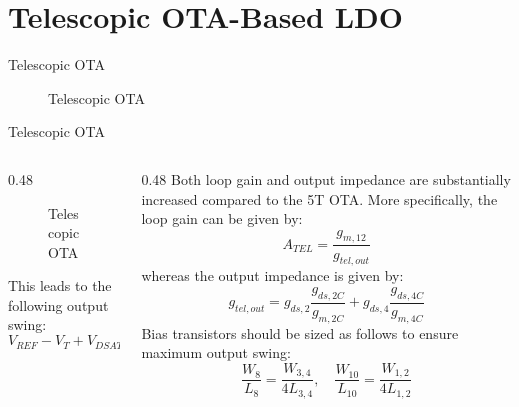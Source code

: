 \documentclass[10pt, aspectratio=169]{beamer}
\newcommand{\svg}[3]{
    \begin{figure}
        \centering
        
        \caption{#2}
    \end{figure}
}
\begin{document}
\section{Telescopic OTA-Based LDO}
\begin{frame}{Telescopic OTA}
    \svg{../images/tel_ota.svg}{Telescopic OTA}{1}
\end{frame}
\begin{frame}{Telescopic OTA}
    \begin{columns}[c,onlytextwidth]
        \begin{column}{0.48\textwidth}
            \svg{../images/tel_ota.svg}{Telescopic OTA}{1}
            This leads to the following output swing:
            \begin{equation*}
                V_{REF} - V_{T} + V_{DSAT} \leq V_{OUT} \leq V_{EXT} - 2V_{DSAT}
            \end{equation*}
        \end{column}
        \begin{column}{0.48\textwidth}
            Both loop gain and output impedance are substantially increased compared to the 5T OTA. More specifically, the loop gain can be given by:
            \begin{equation*}
                A_{TEL} = \frac{g_{m,12}}{g_{tel,out}}
            \end{equation*}
            whereas the output impedance is given by:
            \begin{equation*}
                g_{tel,out} =
                    g_{ds,2} \frac{g_{ds,2C}}{g_{m,2C}} +
                    g_{ds,4} \frac{g_{ds,4C}}{g_{m,4C}}
            \end{equation*}
            Bias transistors should be sized as follows to ensure maximum output swing:
            \begin{equation*}
                \frac{W_{8}}{L_{8}} = \frac{W_{3,4}}{4L_{3,4}},
                \quad
                \frac{W_{10}}{L_{10}} = \frac{W_{1,2}}{4L_{1,2}}
            \end{equation*}
        \end{column}
    \end{columns}
\end{frame}
\end{document}

